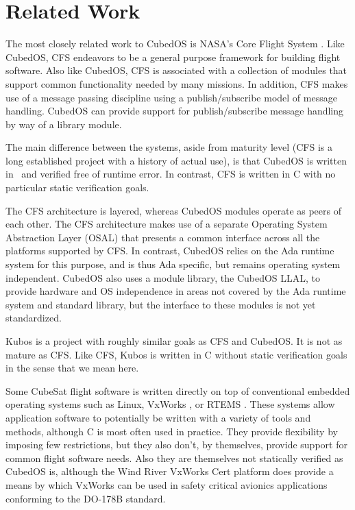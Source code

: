 
\chapter{Related Work}
\label{chapt:related-work}

The most closely related work to CubedOS is NASA's Core Flight System \cite{cFE}. Like CubedOS,
CFS endeavors to be a general purpose framework for building flight software. Also like CubedOS,
CFS is associated with a collection of modules that support common functionality needed by many
missions. In addition, CFS makes use of a message passing discipline using a publish/subscribe
model of message handling. CubedOS can provide support for publish/subscribe message handling by
way of a library module.

The main difference between the systems, aside from maturity level (CFS is a long established
project with a history of actual use), is that CubedOS is written in \SPARK\ and verified free
of runtime error. In contrast, CFS is written in C with no particular static verification goals.

The CFS architecture is layered, whereas CubedOS modules operate as peers of each other. The CFS
architecture makes use of a separate Operating System Abstraction Layer (OSAL) that presents a
common interface across all the platforms supported by CFS. In contrast, CubedOS relies on the
Ada runtime system for this purpose, and is thus Ada specific, but remains operating system
independent. CubedOS also uses a module library, the CubedOS LLAL, to provide hardware and OS
independence in areas not covered by the Ada runtime system and standard library, but the
interface to these modules is not yet standardized.

Kubos \cite{kubos} is a project with roughly similar goals as CFS and CubedOS. It is not as
mature as CFS. Like CFS, Kubos is written in C without static verification goals in the sense
that we mean here.

Some CubeSat flight software is written directly on top of conventional embedded operating
systems such as Linux, VxWorks \cite{vxworks}, or RTEMS \cite{rtems}. These systems allow
application software to potentially be written with a variety of tools and methods, although C
is most often used in practice. They provide flexibility by imposing few restrictions, but they
also don't, by themselves, provide support for common flight software needs. Also they are
themselves not statically verified as CubedOS is, although the Wind River VxWorks Cert platform
\cite{vxworks-cert} does provide a means by which VxWorks can be used in safety critical
avionics applications conforming to the DO-178B standard.
